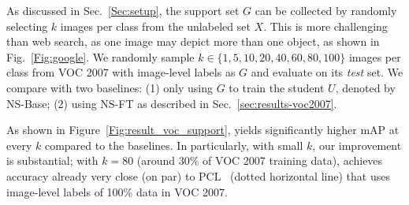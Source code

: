 {As discussed in Sec.~\ref{Sec:setup}, the support set $G$ can be collected by randomly selecting $k$ images per class from the unlabeled set $X$. This is more challenging than web search, as one image may depict more than one object, as shown in Fig.~\ref{Fig:google}. We randomly sample $k \in \{1, 5, 10, 20, 40, 60, 80, 100\}$ images per class from
	VOC 2007 with image-level labels as $G$ and evaluate on its \emph{test} set.} 
We compare \ours with two baselines: (1) only using $G$ to train the student $U$, denoted by NS-Base; (2) using NS-FT as described in Sec.~\ref{sec:results-voc2007}.

{As shown in Figure~\ref{Fig:result_voc_support}, \ours yields significantly higher mAP at every $k$ compared to the baselines. In particularly, with small $k$, our improvement is substantial; with $k=80$ (around 30\% of VOC 2007 training data), \ours achieves accuracy already very close (on par) to PCL~\cite{tang2018pami} (dotted horizontal line) that uses image-level labels of 100\% data in VOC 2007.}


